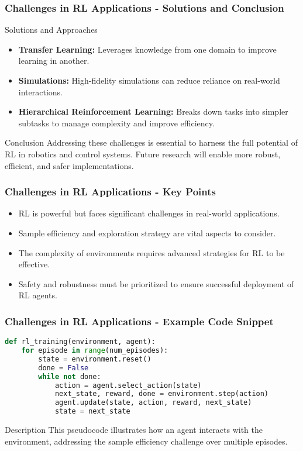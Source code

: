 \documentclass[aspectratio=169]{beamer}
\begin{document}
\begin{frame}[fragile]
    \frametitle{Challenges in RL Applications - Solutions and Conclusion}
    \begin{block}{Solutions and Approaches}
        \begin{itemize}
            \item \textbf{Transfer Learning:} Leverages knowledge from one domain to improve learning in another.
            \item \textbf{Simulations:} High-fidelity simulations can reduce reliance on real-world interactions.
            \item \textbf{Hierarchical Reinforcement Learning:} Breaks down tasks into simpler subtasks to manage complexity and improve efficiency.
        \end{itemize}
    \end{block}

    \begin{block}{Conclusion}
        Addressing these challenges is essential to harness the full potential of RL in robotics and control systems. Future research will enable more robust, efficient, and safer implementations.
    \end{block}
\end{frame}

\begin{frame}[fragile]
    \frametitle{Challenges in RL Applications - Key Points}
    \begin{itemize}
        \item RL is powerful but faces significant challenges in real-world applications.
        \item Sample efficiency and exploration strategy are vital aspects to consider.
        \item The complexity of environments requires advanced strategies for RL to be effective.
        \item Safety and robustness must be prioritized to ensure successful deployment of RL agents.
    \end{itemize}
\end{frame}

\begin{frame}[fragile]
    \frametitle{Challenges in RL Applications - Example Code Snippet}
    \begin{lstlisting}[language=Python]
def rl_training(environment, agent):
    for episode in range(num_episodes):
        state = environment.reset()
        done = False
        while not done:
            action = agent.select_action(state)
            next_state, reward, done = environment.step(action)
            agent.update(state, action, reward, next_state)
            state = next_state
    \end{lstlisting}
    \begin{block}{Description}
        This pseudocode illustrates how an agent interacts with the environment, addressing the sample efficiency challenge over multiple episodes.
    \end{block}
\end{frame}
\end{document}
